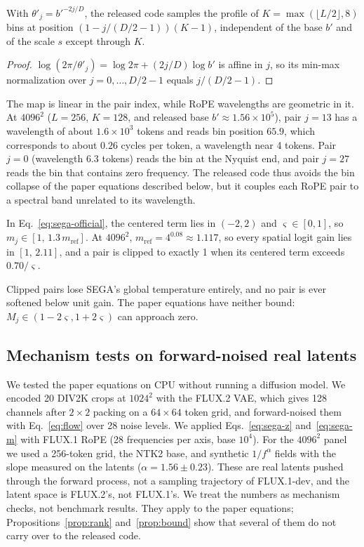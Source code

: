 \begin{proposition}
\label{prop:rank}
With $\theta'_j = b'^{-2j/D}$, the released code samples the profile of $K=\max(\lfloor L/2\rfloor,8)$ bins at position $(1-j/(D/2-1))(K-1)$, independent of the base $b'$ and of the scale $s$ except through $K$.
\end{proposition}
\begin{proof}
$\log(2\pi/\theta'_j) = \log 2\pi + (2j/D)\log b'$ is affine in $j$, so its min-max normalization over $j=0,\dots,D/2-1$ equals $j/(D/2-1)$.
\end{proof}
The map is linear in the pair index, while RoPE wavelengths are geometric in it. At $4096^2$ ($L=256$, $K=128$, and released base $b'\approx1.56\times10^5$), pair $j=13$ has a wavelength of about $1.6\times10^3$ tokens and reads bin position $65.9$, which corresponds to about $0.26$ cycles per token, a wavelength near 4 tokens. Pair $j=0$ (wavelength $6.3$ tokens) reads the bin at the Nyquist end, and pair $j=27$ reads the bin that contains zero frequency. The released code thus avoids the bin collapse of the paper equations described below, but it couples each RoPE pair to a spectral band unrelated to its wavelength.

\begin{proposition}
\label{prop:bound}
In Eq.~\eqref{eq:sega-official}, the centered term lies in $(-2,2)$ and $\varsigma\in[0,1]$, so $m_j\in[1,\,1.3\,m_{\mathrm{ref}}]$. At $4096^2$, $m_{\mathrm{ref}}=4^{0.08}\approx1.117$, so every spatial logit gain lies in $[1,\,2.11]$, and a pair is clipped to exactly 1 when its centered term exceeds $0.70/\varsigma$.
\end{proposition}
Clipped pairs lose SEGA's global temperature entirely, and no pair is ever softened below unit gain. The paper equations have neither bound: $M_j\in(1-2\varsigma,1+2\varsigma)$ can approach zero.

\subsection{Mechanism tests on forward-noised real latents}
\label{sec:sega-tests}

We tested the paper equations on CPU without running a diffusion model. We encoded 20 DIV2K crops at $1024^2$ with the FLUX.2 VAE, which gives 128 channels after $2\times2$ packing on a $64\times64$ token grid, and forward-noised them with Eq.~\eqref{eq:flow} over 28 noise levels. We applied Eqs.~\eqref{eq:sega-z} and~\eqref{eq:sega-m} with FLUX.1 RoPE (28 frequencies per axis, base $10^4$). For the $4096^2$ panel we used a 256-token grid, the NTK2 base, and synthetic $1/f^{\alpha}$ fields with the slope measured on the latents ($\alpha=1.56\pm0.23$). These are real latents pushed through the forward process, not a sampling trajectory of FLUX.1-dev, and the latent space is FLUX.2's, not FLUX.1's. We treat the numbers as mechanism checks, not benchmark results. They apply to the paper equations; Propositions~\ref{prop:rank} and~\ref{prop:bound} show that several of them do not carry over to the released code.

